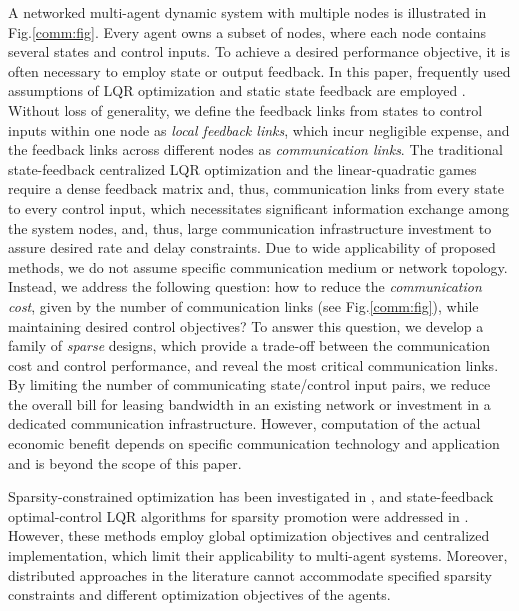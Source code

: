 \documentclass[12pt, draftclsnofoot,onecolumn]{IEEEtran}
\begin{document}
A networked multi-agent dynamic system with multiple nodes is illustrated in Fig.\ref{comm:fig}. Every agent owns a subset of nodes, where each node contains several states and control inputs. To achieve a desired performance objective, it is often necessary to employ state or output feedback. In this paper, frequently used assumptions of LQR optimization and static state feedback are employed \cite{lewis1995optimal}. Without loss of generality, we define the feedback links from states to control inputs within one node as {\it local feedback links}, which incur negligible expense, and the feedback links across different nodes as {\it communication links}. The traditional state-feedback centralized LQR optimization \cite{lewis1995optimal} and the linear-quadratic games \cite{basar85,LUKES197196,Mukaidani2006} require a dense feedback matrix and, thus, communication links from every state to every control input, which necessitates significant information exchange among the system nodes, and, thus, large communication infrastructure investment to assure desired rate and delay constraints. Due to wide applicability of proposed methods, we do not assume specific communication medium or network topology. Instead, we address the following question: how to reduce the {\it communication cost}, given by the number of communication links (see Fig.\ref{comm:fig}), while maintaining desired control objectives? To answer this question, we develop a family of {\it sparse} designs, which provide a trade-off between the communication cost and control performance, and reveal the most critical communication links. By limiting the number of communicating state/control input pairs, we reduce the overall bill for leasing bandwidth in an existing network or investment in a dedicated communication infrastructure. However, computation of the actual economic benefit depends on specific communication technology and application and is beyond the scope of this paper. 

Sparsity-constrained optimization has been investigated in \cite{bahmani2013greedy,beck2013sparsity}, and state-feedback optimal-control LQR algorithms for sparsity promotion were addressed in \cite{dorjovchebulTPS14,lin2013design}. However, these methods employ global optimization objectives and centralized implementation, which limit their applicability to multi-agent systems. Moreover, distributed approaches in the literature \cite{lamperski2015optimal,mota2013d} cannot accommodate specified sparsity constraints and different optimization objectives of the agents.
\end{document}
